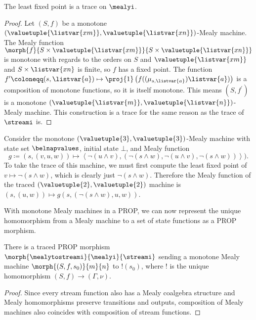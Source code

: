 \begin{proposition}
    The least fixed point is a trace on \(\mealyi\).
\end{proposition}
\begin{proof}
    Let \((S, f)\) be a monotone
    \((\valuetuple{\listvar{xm}}, \valuetuple{\listvar{xn}})\)-Mealy machine.
    The Mealy function \(
    \morph{f}{
        S \times \valuetuple{\listvar{xm}}
    }{
        S \times \valuetuple{\listvar{xn}}
    }
    \) is monotone with regards to the orders on \(S\) and
    \(\valuetuple{\listvar{xm}}\) and \(S \times \listvar{xn}\) is finite, so
    \(f\) has a fixed point.
    The function \(
    f^\prime \coloneqq (s, \listvar{a})
    \mapsto
    \proj{1}\left(f((\mu_{s,\listvar{a}})\listvar{a})\right)
    \) is a composition of monotone functions, so it is itself monotone.
    This means \((S, f^\prime)\) is a monotone \(
    (\valuetuple{\listvar{m}}, \valuetuple{\listvar{n}})
    \)-Mealy machine.
    This construction is a trace for the same reason as the trace of
    \(\streami\) is.
\end{proof}

\begin{example}\label{ex:trace-mealy}
    Consider the monotone \((\valuetuple{3},\valuetuple{3})\)-Mealy machine with
    state set \(\belnapvalues\), initial state \(\bot\), and Mealy function \[
        g \coloneqq (s, (v, u, w))
        \mapsto \left\langle
        \neg(u \land v),
        (\neg(s \land w), \neg(u \land v), \neg(s \land w))
        \right\rangle
        ).\]
    To take the trace of this machine, we must first compute the least fixed
    point of \(v \mapsto \neg(s \land w)\), which is clearly just
    \(\neg(s \land w)\).
    Therefore the Mealy function of the traced
    \((\valuetuple{2}, \valuetuple{2})\) machine is \(
    (s, (u, w)) \mapsto g(s, (\neg(s \land w), u, w))
    \).
\end{example}

With monotone Mealy machines in a PROP, we can now represent the unique
homomorphism from a Mealy machine to a set of state functions as a PROP
morphism.

\begin{proposition}\label{prop:mealy-to-stream}
    There is a traced PROP morphism
    \(\morph{\mealytostreami}{\mealyi}{\streami}\) sending a monotone Mealy
    machine \(\morph{\left(S, f, s_0\right)}{m}{n}\) to \(!(s_0)\), where \(!\)
    is the unique homomorphism \((S,f) \to (\Gamma,\nu)\).
\end{proposition}
\begin{proof}
    Since every stream function also has a Mealy coalgebra structure and Mealy
    homomorphisms preserve transitions and outputs,
    composition of Mealy machines also coincides with composition of stream
    functions.
\end{proof}

